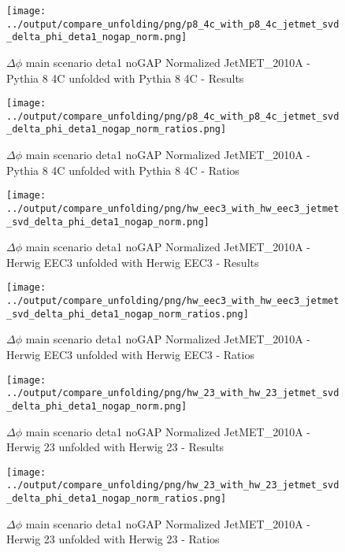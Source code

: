 \documentclass[11pt]{book}
\begin{document}
\begin{figure}[ht]
\centering
\texttt{[image: ../output/compare\_unfolding/png/p8\_4c\_with\_p8\_4c\_jetmet\_svd\_delta\_phi\_deta1\_nogap\_norm.png]}
\caption{$\Delta\phi$ main scenario deta1 noGAP Normalized JetMET\_2010A - Pythia 8 4C unfolded with Pythia 8 4C - Results}
\label{p8_p8_jetmet_svd_delta_phi_deta1_nogap_norm_a}
\end{figure}

\begin{figure}[ht]
\centering
\texttt{[image: ../output/compare\_unfolding/png/p8\_4c\_with\_p8\_4c\_jetmet\_svd\_delta\_phi\_deta1\_nogap\_norm\_ratios.png]}
\caption{$\Delta\phi$ main scenario deta1 noGAP Normalized JetMET\_2010A - Pythia 8 4C unfolded with Pythia 8 4C - Ratios}
\label{p8_p8_jetmet_svd_delta_phi_deta1_nogap_norm_b}
\end{figure}

\begin{figure}[ht]
\centering
\texttt{[image: ../output/compare\_unfolding/png/hw\_eec3\_with\_hw\_eec3\_jetmet\_svd\_delta\_phi\_deta1\_nogap\_norm.png]}
\caption{$\Delta\phi$ main scenario deta1 noGAP Normalized JetMET\_2010A - Herwig EEC3 unfolded with Herwig EEC3 - Results}
\label{hw_eec3_hw_eec3_jetmet_svd_delta_phi_deta1_nogap_norm_a}
\end{figure}

\begin{figure}[ht]
\centering
\texttt{[image: ../output/compare\_unfolding/png/hw\_eec3\_with\_hw\_eec3\_jetmet\_svd\_delta\_phi\_deta1\_nogap\_norm\_ratios.png]}
\caption{$\Delta\phi$ main scenario deta1 noGAP Normalized JetMET\_2010A - Herwig EEC3 unfolded with Herwig EEC3 - Ratios}
\label{hw_eec3_hw_eec3_jetmet_svd_delta_phi_deta1_nogap_norm_b}
\end{figure}

\begin{figure}[ht]
\centering
\texttt{[image: ../output/compare\_unfolding/png/hw\_23\_with\_hw\_23\_jetmet\_svd\_delta\_phi\_deta1\_nogap\_norm.png]}
\caption{$\Delta\phi$ main scenario deta1 noGAP Normalized JetMET\_2010A - Herwig 23 unfolded with Herwig 23 - Results}
\label{hw_23_hw_23_jetmet_svd_delta_phi_deta1_nogap_norm_a}
\end{figure}

\begin{figure}[ht]
\centering
\texttt{[image: ../output/compare\_unfolding/png/hw\_23\_with\_hw\_23\_jetmet\_svd\_delta\_phi\_deta1\_nogap\_norm\_ratios.png]}
\caption{$\Delta\phi$ main scenario deta1 noGAP Normalized JetMET\_2010A - Herwig 23 unfolded with Herwig 23 - Ratios}
\label{hw_23_hw_23_jetmet_svd_delta_phi_deta1_nogap_norm_b}
\end{figure}
\end{document}
